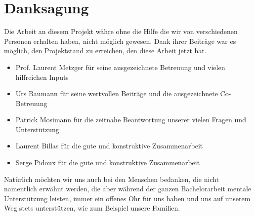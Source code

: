 \section{Danksagung}

Die Arbeit an diesem Projekt währe ohne die Hilfe die wir von verschiedenen Personen erhalten haben, nicht möglich gewesen. Dank ihrer Beiträge war es möglich, den Projektstand zu erreichen, den diese Arbeit jetzt hat.

\begin{itemize}
	\item Prof. Laurent Metzger für seine ausgezeichnete Betreuung und vielen hilfreichen Inputs
	\item Urs Baumann für seine wertvollen Beiträge und die ausgezeichnete Co-Betreuung
	\item Patrick Mosimann für die zeitnahe Beantwortung unserer vielen Fragen und Unterstützung 
	\item Laurent Billas für die gute und konstruktive Zusammenarbeit
	\item Serge Pidoux für die gute und konstruktive Zusammenarbeit
\end{itemize}

Natürlich möchten wir uns auch bei den Menschen bedanken, die nicht namentlich erwähnt werden, die aber während der ganzen Bachelorarbeit mentale Unterstützung leisten, immer ein offenes Ohr für uns haben und uns auf unserem Weg stets unterstützen, wie zum Beispiel unsere Familien.